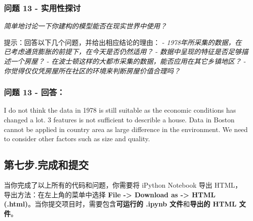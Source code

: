 \documentclass[11pt]{article}
\begin{document}
    \subsubsection{问题 13 -
实用性探讨}\label{ux95eeux9898-13---ux5b9eux7528ux6027ux63a2ux8ba8}

\emph{简单地讨论一下你建构的模型能否在现实世界中使用？}

提示：回答以下几个问题，并给出相应结论的理由： -
\emph{1978年所采集的数据，在已考虑通货膨胀的前提下，在今天是否仍然适用？}
- \emph{数据中呈现的特征是否足够描述一个房屋？} -
\emph{在波士顿这样的大都市采集的数据，能否应用在其它乡镇地区？} -
\emph{你觉得仅仅凭房屋所在社区的环境来判断房屋价值合理吗？}

    \subsubsection{问题 13 - 回答：}\label{ux95eeux9898-13---ux56deux7b54}

I do not think the data in 1978 is still suitable as the economic
conditions has changed a lot. 3 features is not sufficient to describle
a house. Data in Boston cannot be applied in country area as large
difference in the environment. We need to consider other factors such as
size and quality.

    \subsection{第七步.完成和提交}\label{ux7b2cux4e03ux6b65.ux5b8cux6210ux548cux63d0ux4ea4}

    当你完成了以上所有的代码和问题，你需要将 iPython Notebook 导出
HTML，导出方法：在左上角的菜单中选择 \textbf{File -\textgreater{}
Download as -\textgreater{} HTML
(.html)}。当你提交项目时，需要包含\textbf{可运行的 .ipynb
文件}和\textbf{导出的 HTML 文件}。


    
    
    
    
\end{document}
